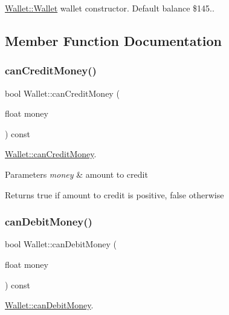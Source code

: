 \mbox{\hyperlink{classWallet_ad9be9e49244b78db9099fcaeccd1af04}{Wallet\+::\+Wallet}} wallet constructor. Default balance \$145.. 



\subsection{Member Function Documentation}
\mbox{\label{classWallet_a69b488bc31201592bb860b6fdaafa1b8}} 
\subsubsection{\texorpdfstring{canCreditMoney()}{canCreditMoney()}}
{\footnotesize\ttfamily bool Wallet\+::can\+Credit\+Money (\begin{DoxyParamCaption}\item[{float}]{money }\end{DoxyParamCaption}) const}



\mbox{\hyperlink{classWallet_a69b488bc31201592bb860b6fdaafa1b8}{Wallet\+::can\+Credit\+Money}}. 


\begin{DoxyParams}{Parameters}
{\em money} & amount to credit \\
\hline
\end{DoxyParams}
\begin{DoxyReturn}{Returns}
true if amount to credit is positive, false otherwise 
\end{DoxyReturn}
\mbox{\label{classWallet_a1583a38c87dd04ecd5854f15590e170d}} 
\subsubsection{\texorpdfstring{canDebitMoney()}{canDebitMoney()}}
{\footnotesize\ttfamily bool Wallet\+::can\+Debit\+Money (\begin{DoxyParamCaption}\item[{float}]{money }\end{DoxyParamCaption}) const}



\mbox{\hyperlink{classWallet_a1583a38c87dd04ecd5854f15590e170d}{Wallet\+::can\+Debit\+Money}}. 


